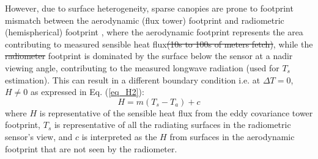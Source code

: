 \documentclass[fleqn,10pt]{wlscirep}
\providecommand{\DIFaddtex}[1]{{\protect\color{blue}\uwave{#1}}} %
\providecommand{\DIFdeltex}[1]{{\protect\color{red}\sout{#1}}}                      %
\providecommand{\DIFaddbegin}{} %
\providecommand{\DIFaddend}{} %
\providecommand{\DIFdelbegin}{} %
\providecommand{\DIFdelend}{} %
\providecommand{\DIFadd}[1]{\texorpdfstring{\DIFaddtex{#1}}{#1}} %
\providecommand{\DIFdel}[1]{\texorpdfstring{\DIFdeltex{#1}}{}} %
\begin{document}
However, due to surface heterogeneity, sparse canopies are prone to footprint mismatch between the aerodynamic (flux tower) footprint and radiometric (hemispherical) footprint \cite{chu2021representativeness,marcolla2018geometry,morillas2013using}, where the aerodynamic footprint represents the area contributing to measured sensible heat flux\DIFdelbegin \DIFdel{(10s to 100s of meters fetch)}\DIFdelend , while the \DIFdelbegin \DIFdel{radiometer }\DIFdelend \DIFaddbegin \DIFadd{radiometric }\DIFaddend footprint is dominated by the surface below the sensor at a nadir viewing angle, contributing to the measured longwave radiation (used for $T_{s}$ estimation). This can result in a different boundary condition i.e. at $\Delta T =0$, $H \not= 0$ as expressed in Eq. (\ref{eq_H2}): 
\begin{equation}\label{eq_H2}
H= m(T_{s} - T_{a}) +  c    
\end{equation}
where $H$ is representative of the sensible heat flux from the eddy covariance tower footprint, $T_{s}$ is representative of all the radiating surfaces in the radiometric sensor’s view, and $c$ is interpreted as the $H$ from surfaces in the aerodynamic footprint that are not seen by the radiometer. 
\end{document}

